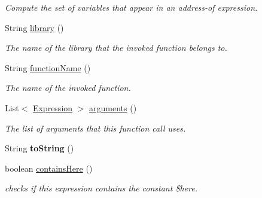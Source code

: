 \begin{DoxyCompactItemize}
\begin{DoxyCompactList}\small\item\em Compute the set of variables that appear in an address-\/of expression. \end{DoxyCompactList}\item 
String \hyperlink{classedu_1_1udel_1_1cis_1_1vsl_1_1civl_1_1model_1_1common_1_1expression_1_1CommonSystemGuardExpression_a6cf4df088f3f1aec840e5cd470249659}{library} ()
\begin{DoxyCompactList}\small\item\em The name of the library that the invoked function belongs to. \end{DoxyCompactList}\item 
String \hyperlink{classedu_1_1udel_1_1cis_1_1vsl_1_1civl_1_1model_1_1common_1_1expression_1_1CommonSystemGuardExpression_a94f12be0f7c9dd233f55af3c96f06c3f}{function\+Name} ()
\begin{DoxyCompactList}\small\item\em The name of the invoked function. \end{DoxyCompactList}\item 
List$<$ \hyperlink{interfaceedu_1_1udel_1_1cis_1_1vsl_1_1civl_1_1model_1_1IF_1_1expression_1_1Expression}{Expression} $>$ \hyperlink{classedu_1_1udel_1_1cis_1_1vsl_1_1civl_1_1model_1_1common_1_1expression_1_1CommonSystemGuardExpression_ab77e03b8c3c57ecd8da9982f001e78cf}{arguments} ()
\begin{DoxyCompactList}\small\item\em The list of arguments that this function call uses. \end{DoxyCompactList}\item 
\hypertarget{classedu_1_1udel_1_1cis_1_1vsl_1_1civl_1_1model_1_1common_1_1expression_1_1CommonSystemGuardExpression_a7e06918f015eaabbff37eb3141ff1869}{}String {\bfseries to\+String} ()\label{classedu_1_1udel_1_1cis_1_1vsl_1_1civl_1_1model_1_1common_1_1expression_1_1CommonSystemGuardExpression_a7e06918f015eaabbff37eb3141ff1869}

\item 
boolean \hyperlink{classedu_1_1udel_1_1cis_1_1vsl_1_1civl_1_1model_1_1common_1_1expression_1_1CommonSystemGuardExpression_a503acdcbe893067268690a6d6ffb46bc}{contains\+Here} ()
\begin{DoxyCompactList}\small\item\em checks if this expression contains the constant \$here. \end{DoxyCompactList}\end{DoxyCompactItemize}
